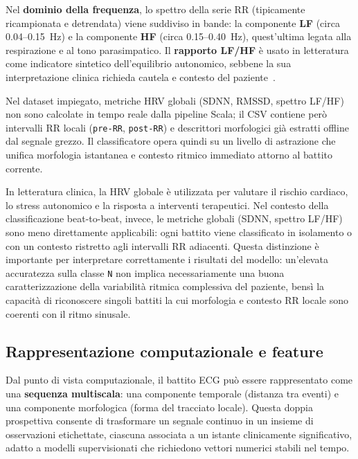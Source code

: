 Nel \textbf{dominio della frequenza}, lo spettro della serie RR (tipicamente ricampionata e detrendata) viene suddiviso in bande:
la componente \textbf{LF} (circa 0.04--0.15~Hz) e la componente \textbf{HF} (circa 0.15--0.40~Hz), quest'ultima legata alla respirazione e al tono parasimpatico.
Il \textbf{rapporto LF/HF} è usato in letteratura come indicatore sintetico dell'equilibrio autonomico, sebbene la sua interpretazione clinica richieda cautela e contesto del paziente~\cite{taskforce1996hrv}.

Nel dataset impiegato, metriche HRV globali (SDNN, RMSSD, spettro LF/HF) non sono calcolate in tempo reale dalla pipeline Scala; il CSV contiene però intervalli RR locali (\texttt{pre-RR}, \texttt{post-RR}) e descrittori morfologici già estratti offline dal segnale grezzo.
Il classificatore opera quindi su un livello di astrazione che unifica morfologia istantanea e contesto ritmico immediato attorno al battito corrente.

In letteratura clinica, la HRV globale è utilizzata per valutare il rischio cardiaco, lo stress autonomico e la risposta a interventi terapeutici.
Nel contesto della classificazione beat-to-beat, invece, le metriche globali (SDNN, spettro LF/HF) sono meno direttamente applicabili: ogni battito viene classificato in isolamento o con un contesto ristretto agli intervalli RR adiacenti.
Questa distinzione è importante per interpretare correttamente i risultati del modello: un'elevata accuratezza sulla classe \texttt{N} non implica necessariamente una buona caratterizzazione della variabilità ritmica complessiva del paziente, bensì la capacità di riconoscere singoli battiti la cui morfologia e contesto RR locale sono coerenti con il ritmo sinusale.

\subsection{Rappresentazione computazionale e feature}

Dal punto di vista computazionale, il battito ECG può essere rappresentato come una \textbf{sequenza multiscala}: una componente temporale (distanza tra eventi) e una componente morfologica (forma del tracciato locale).
Questa doppia prospettiva consente di trasformare un segnale continuo in un insieme di osservazioni etichettate, ciascuna associata a un istante clinicamente significativo, adatto a modelli supervisionati che richiedono vettori numerici stabili nel tempo.

